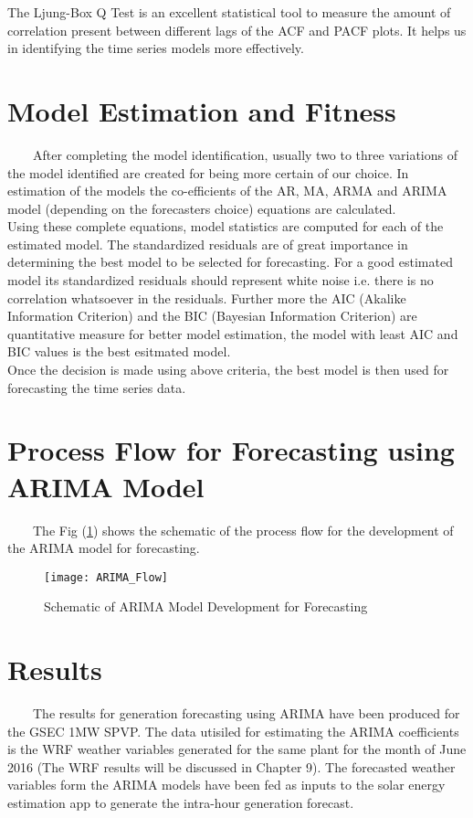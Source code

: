 The Ljung-Box Q Test is an excellent statistical tool to measure the amount of correlation present between different lags of the ACF and PACF plots. It helps us in identifying the time series models more effectively.


\section{Model Estimation and Fitness}
\
\
\
\
After completing the model identification, usually two to three variations of the model identified are created for being more certain of our choice. In estimation of the models the co-efficients of the AR, MA, ARMA and ARIMA model (depending on the forecasters choice) equations are calculated.\\

Using these complete equations, model statistics are computed for each of the estimated model. The standardized residuals are of great importance in determining the best model to be selected for forecasting. For a good estimated model its standardized residuals should represent white noise i.e. there is no correlation whatsoever in the residuals. Further more the AIC (Akalike Information Criterion) and the BIC (Bayesian Information Criterion) are quantitative measure for better model estimation, the model with least AIC and BIC values is the best esitmated model.\\

Once the decision is made using above criteria, the best model is then used for forecasting the time series data.\\




\section{Process Flow for Forecasting using ARIMA Model}
\
\
\
\
The Fig (\ref{figc7ARIMAFlow}) shows the schematic of the process flow for the development of the ARIMA model for forecasting.

\begin{figure}[H]
\centering
\texttt{[image: ARIMA\_Flow]}
\caption{Schematic of ARIMA Model Development for Forecasting}
\label{figc7ARIMAFlow} %
\end{figure}

\section{Results}
\
\
\
\
The results for generation forecasting using ARIMA have been produced for the GSEC 1MW SPVP. The data utisiled for estimating the ARIMA coefficients is the WRF weather variables generated for the same plant for the month of June 2016 (The WRF results will be discussed in Chapter 9). The forecasted weather variables form the ARIMA models have been fed as inputs to the solar energy estimation app to generate the intra-hour generation forecast.\\

